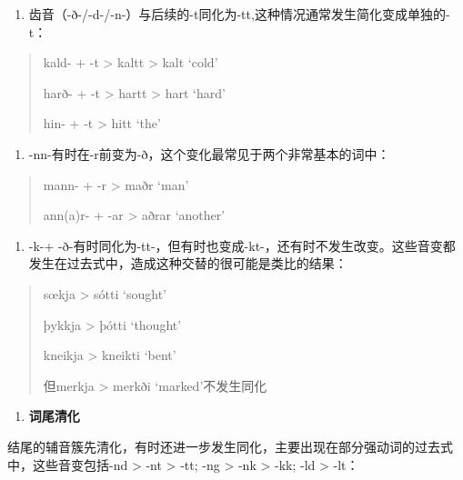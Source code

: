 \begin{enumerate}
  \def\labelenumi{(\alph{enumi})}
  \setcounter{enumi}{2}
  \item
        齿音（-ð-/-d-/-n-）与后续的-t同化为-tt,这种情况通常发生简化变成单独的-t：
\end{enumerate}

\begin{quote}
  kald- + -t \textgreater{} kaltt \textgreater{} kalt `cold'

  harð- + -t \textgreater{} hartt \textgreater{} hart `hard'

  hin- + -t \textgreater{} hitt `the'
\end{quote}

\begin{enumerate}
  \def\labelenumi{(\alph{enumi})}
  \setcounter{enumi}{3}
  \item
        -nn-有时在-r前变为-ð，这个变化最常见于两个非常基本的词中：
\end{enumerate}

\begin{quote}
  mann- + -r \textgreater{} maðr `man'

  ann(a)r- + -ar \textgreater{} aðrar `another'
\end{quote}

\begin{enumerate}
  \def\labelenumi{(\alph{enumi})}
  \setcounter{enumi}{4}
  \item
        -k-+
        -ð-有时同化为-tt-，但有时也变成-kt-，还有时不发生改变。这些音变都发生在过去式中，造成这种交替的很可能是类比的结果：
\end{enumerate}

\begin{quote}
  sœkja \textgreater{} sótti `sought'

  þykkja \textgreater{} þótti `thought'

  kneikja \textgreater{} kneikti `bent'

  但merkja \textgreater{} merkði `marked'不发生同化
\end{quote}

\begin{enumerate}
  \def\labelenumi{\Alph{enumi}.}
  \setcounter{enumi}{1}
  \item
        \textbf{词尾清化}
\end{enumerate}

结尾的辅音簇先清化，有时还进一步发生同化，主要出现在部分强动词的过去式中，这些音变包括-nd
\textgreater{} -nt \textgreater{} -tt; -ng \textgreater{} -nk
\textgreater{} -kk; -ld \textgreater{} -lt：

